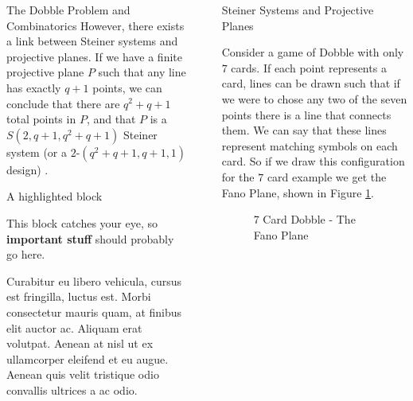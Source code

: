 \documentclass[final]{beamer}
\newlength{\sepwidth}
\newlength{\colwidth}
\newcommand{\separatorcolumn}{\begin{column}{\sepwidth}\end{column}}
\begin{document}
\begin{frame}[t]
\begin{columns}[t]
\begin{column}{\colwidth}
\begin{block}{The Dobble Problem and Combinatorics}
However, there exists a link between Steiner systems and projective planes. If we have a finite projective plane $P$ such that any line has exactly $q+1$ points, we can conclude that there are $q^2+q+1$ total points in $P$, and that $P$ is a $S(2, q+ 1, q^2 +q+ 1)$
Steiner system (or a $2$-$(q^2 +q+ 1, q + 1, 1)$ design) \cite{storme2006}.
  \end{block}

  \begin{alertblock}{A highlighted block}

    This block catches your eye, so \textbf{important stuff} should probably go
    here.

    Curabitur eu libero vehicula, cursus est fringilla, luctus est. Morbi
    consectetur mauris quam, at finibus elit auctor ac. Aliquam erat volutpat.
    Aenean at nisl ut ex ullamcorper eleifend et eu augue. Aenean quis velit
    tristique odio convallis ultrices a ac odio.

  \end{alertblock}

\end{column}

\separatorcolumn

\begin{column}{\colwidth}

  \begin{block}{Steiner Systems and Projective Planes}

    Consider a game of Dobble with only $7$ cards. If each point represents a card, lines can be drawn such that if we were to chose any two of the seven points there is a line that connects them. We can say that these lines represent matching symbols on each card. So if we draw this configuration for the $7$ card example we get the Fano Plane, shown in Figure \ref{fig:fano}.
    \begin{multicols}{2}
\begin{figure}
      \centering
      \caption{7 Card Dobble - The Fano Plane}
      \label{fig:fano}
\end{figure}


\end{multicols}
\end{block}
\end{column}
\end{columns}
\end{frame}
\end{document}
